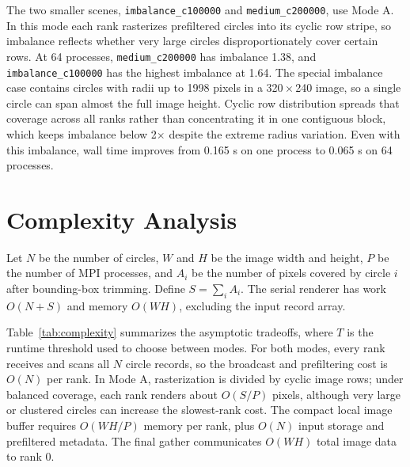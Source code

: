 \documentclass{article}
\begin{document}
The two smaller scenes, \texttt{imbalance\_c100000} and \texttt{medium\_c200000}, use Mode A. In this mode each rank rasterizes prefiltered circles into its cyclic row stripe, so imbalance reflects whether very large circles disproportionately cover certain rows. At 64 processes, \texttt{medium\_c200000} has imbalance 1.38, and \texttt{imbalance\_c100000} has the highest imbalance at 1.64. The special imbalance case contains circles with radii up to 1998 pixels in a 320\,$\times$\,240 image, so a single circle can span almost the full image height. Cyclic row distribution spreads that coverage across all ranks rather than concentrating it in one contiguous block, which keeps imbalance below 2\(\times\) despite the extreme radius variation. Even with this imbalance, wall time improves from 0.165 s on one process to 0.065 s on 64 processes.

\section{Complexity Analysis}
Let \(N\) be the number of circles, \(W\) and \(H\) be the image width and height, \(P\) be the number of MPI processes, and \(A_i\) be the number of pixels covered by circle \(i\) after bounding-box trimming. Define \(S = \sum_i A_i\). The serial renderer has work \(O(N + S)\) and memory \(O(WH)\), excluding the input record array.

\begin{table}[htbp]
\centering
{}
\caption{Asymptotic comparison of the two MPI rendering modes.}
\label{tab:complexity}
\end{table}

Table~\ref{tab:complexity} summarizes the asymptotic tradeoffs, where \(T\) is the runtime threshold used to choose between modes. For both modes, every rank receives and scans all \(N\) circle records, so the broadcast and prefiltering cost is \(O(N)\) per rank. In Mode A, rasterization is divided by cyclic image rows; under balanced coverage, each rank renders about \(O(S/P)\) pixels, although very large or clustered circles can increase the slowest-rank cost. The compact local image buffer requires \(O(WH/P)\) memory per rank, plus \(O(N)\) input storage and prefiltered metadata. The final gather communicates \(O(WH)\) total image data to rank 0.
\end{document}
